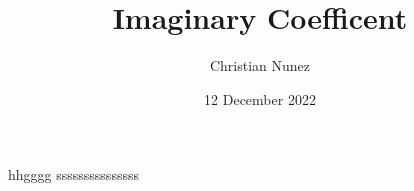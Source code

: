 \documentclass[mla8]{mla}
\title{Imaginary Coefficent}
\author{Christian Nunez}
\date{12 December 2022}
\begin{document}
\hspace{0.49 in}hhgggg sssssssssssssss
\end{document}
